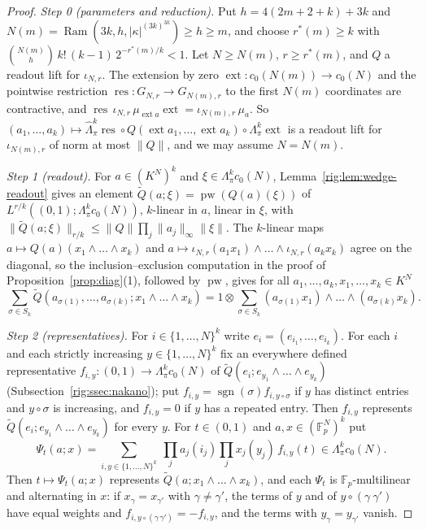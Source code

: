 \documentclass[11pt]{amsart}
\theoremstyle{definition}
\theoremstyle{remark}
\numberwithin{equation}{section}
\newcommand{\F}{\mathbb F}
\newcommand{\sgn}{\operatorname{sgn}}
\newcommand{\abs}[1]{\lvert #1\rvert}
\newcommand{\norm}[1]{\lVert #1\rVert}
\theoremstyle{plain}
\theoremstyle{definition}
\theoremstyle{plain}
\begin{document}
\begin{proof}
\emph{Step 0 (parameters and reduction).} Put $h=4(2m+2+k)+3k$ and
$N(m)=\operatorname{Ram}(3k,h,\abs\kappa^{(3k)^{3k}})\ge h\ge m$, and choose $r^*(m)\ge k$ with
$\binom{N(m)}h\,k!\,(k-1)\,2^{-r^*(m)/k}<1$. Let $N\ge N(m)$, $r\ge r^*(m)$, and $Q$ a readout lift for $\iota_{N,r}$.
The extension by zero $\operatorname{ext}\colon c_0(N(m))\to c_0(N)$ and the pointwise restriction
$\operatorname{res}\colon G_{N,r}\to G_{N(m),r}$ to the first $N(m)$ coordinates are contractive, and $\operatorname{res}\,\iota_{N,r}\,\mu_{\operatorname{ext}a}\operatorname{ext}=\iota_{N(m),r}\,\mu_a$. So
$(a_1,\dots,a_k)\mapsto\widehat\Lambda^k_\pi\operatorname{res}\circ Q(\operatorname{ext}a_1,\dots,\operatorname{ext}a_k)
\circ\Lambda^k_\pi\operatorname{ext}$ is a readout lift for $\iota_{N(m),r}$ of norm at most $\norm Q$, and we may
assume $N=N(m)$.

\emph{Step 1 (readout).} For $a\in(K^N)^k$ and $\xi\in\Lambda^k_\pi c_0(N)$, Lemma~\ref{rig:lem:wedge-readout} gives an element
$\widetilde Q(a;\xi)=\operatorname{pw}(Q(a)(\xi))$ of $L^{r/k}((0,1);\Lambda^k_\pi c_0(N))$, $k$\nobreakdash-linear in $a$,
linear in $\xi$, with $\norm{\widetilde Q(a;\xi)}_{r/k}\le\norm Q\prod_j\norm{a_j}_\infty\norm\xi$. The
$k$\nobreakdash-linear maps $a\mapsto Q(a)(x_1\wedge\dots\wedge x_k)$ and
$a\mapsto\iota_{N,r}(a_1x_1)\wedge\dots\wedge\iota_{N,r}(a_kx_k)$ agree on the diagonal, so the inclusion--exclusion
computation in the proof of Proposition~\ref{prop:diag}(1), followed by $\operatorname{pw}$, gives for all
$a_1,\dots,a_k,x_1,\dots,x_k\in K^N$
\begin{equation}\label{rig:eq:pol}
 \sum_{\sigma\in S_k}\widetilde Q(a_{\sigma(1)},\dots,a_{\sigma(k)};x_1\wedge\dots\wedge x_k)
 =1\otimes\sum_{\sigma\in S_k}(a_{\sigma(1)}x_1)\wedge\dots\wedge(a_{\sigma(k)}x_k).
\end{equation}

\emph{Step 2 (representatives).} For $i\in\{1,\dots,N\}^k$ write $e_i=(e_{i_1},\dots,e_{i_k})$. For each $i$ and each
strictly increasing $y\in\{1,\dots,N\}^k$ fix an everywhere defined representative
$f_{i,y}\colon(0,1)\to\Lambda^k_\pi c_0(N)$ of $\widetilde Q(e_i;e_{y_1}\wedge\dots\wedge e_{y_k})$
(Subsection~\ref{rig:ssec:nakano}); put $f_{i,y}=\sgn(\sigma)f_{i,y\circ\sigma}$ if $y$ has distinct entries and
$y\circ\sigma$ is increasing, and $f_{i,y}=0$ if $y$ has a repeated entry. Then $f_{i,y}$ represents
$\widetilde Q(e_i;e_{y_1}\wedge\dots\wedge e_{y_k})$ for every $y$. For $t\in(0,1)$ and $a,x\in(\F_p^N)^k$ put
\[
 \Psi_t(a;x)=\sum_{i,y\in\{1,\dots,N\}^k}\ \prod_ja_j(i_j)\prod_jx_j(y_j)\,f_{i,y}(t)\in\Lambda^k_\pi c_0(N).
\]
Then $t\mapsto\Psi_t(a;x)$ represents $\widetilde Q(a;x_1\wedge\dots\wedge x_k)$, and each $\Psi_t$ is
$\F_p$\nobreakdash-multilinear and alternating in $x$: if $x_\gamma=x_{\gamma'}$ with $\gamma\ne\gamma'$, the terms of $y$
and of $y\circ(\gamma\ \gamma')$ have equal weights and $f_{i,y\circ(\gamma\,\gamma')}=-f_{i,y}$, and the terms with
$y_\gamma=y_{\gamma'}$ vanish.


\end{proof}
\end{document}
